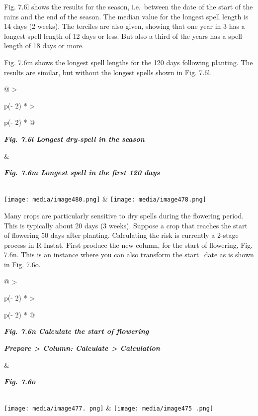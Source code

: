 \documentclass[
  letterpaper,
  DIV=11,
  numbers=noendperiod]{scrreprt}
\begin{document}
Fig. 7.6l shows the results for the season, i.e.~between the date of the
start of the rains and the end of the season. The median value for the
longest spell length is 14 days (2 weeks). The terciles are also given,
showing that one year in 3 has a longest spell length of 12 days or
less. But also a third of the years has a spell length of 18 days or
more.

Fig. 7.6m shows the longest spell lengths for the 120 days following
planting. The results are similar, but without the longest spells shown
in Fig. 7.6l.

\begin{longtable}[]{@{}
  >{\raggedright\arraybackslash}p{(\columnwidth - 2\tabcolsep) * }
  >{\raggedright\arraybackslash}p{(\columnwidth - 2\tabcolsep) * }@{}}
\toprule\noalign{}
\begin{minipage}[b]{\linewidth}\raggedright
\textbf{\emph{Fig. 7.6l Longest dry-spell in the season}}
\end{minipage} & \begin{minipage}[b]{\linewidth}\raggedright
\textbf{\emph{Fig. 7.6m Longest spell in the first 120 days}}
\end{minipage} \\
\midrule\noalign{}
\endhead
\bottomrule\noalign{}
\endlastfoot
\texttt{[image: media/image480.png]} &
\texttt{[image: media/image478.png]} \\
\end{longtable}

Many crops are particularly sensitive to dry spells during the flowering
period. This is typically about 20 days (3 weeks). Suppose a crop that
reaches the start of flowering 50 days after planting. Calculating the
risk is currently a 2-stage process in R-Instat. First produce the new
column, for the start of flowering, Fig. 7.6n. This is an instance where
you can also transform the start\_date as is shown in Fig. 7.6o.

\begin{longtable}[]{@{}
  >{\raggedright\arraybackslash}p{(\columnwidth - 2\tabcolsep) * }
  >{\raggedright\arraybackslash}p{(\columnwidth - 2\tabcolsep) * }@{}}
\toprule\noalign{}
\begin{minipage}[b]{\linewidth}\raggedright
\textbf{\emph{Fig. 7.6n Calculate the start of flowering}}

\textbf{\emph{Prepare \textgreater{} Column: Calculate \textgreater{}
Calculation}}
\end{minipage} & \begin{minipage}[b]{\linewidth}\raggedright
\textbf{\emph{Fig. 7.6o}}
\end{minipage} \\
\midrule\noalign{}
\endhead
\bottomrule\noalign{}
\endlastfoot
\texttt{[image: media/image477. png]} &
\texttt{[image: media/image475 .png]} \\
\end{longtable}
\end{document}
